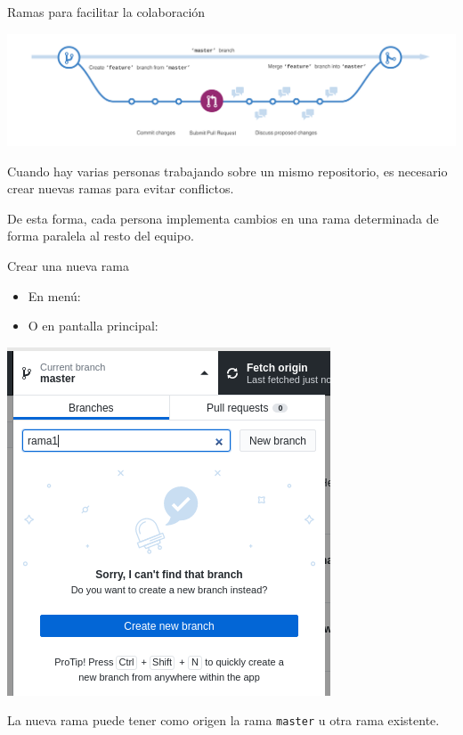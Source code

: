 \documentclass[xcolor={usenames,svgnames,dvipsnames}]{beamer}
\begin{document}
\begin{frame}[label={sec:orgbf606f8}]{Ramas para facilitar la colaboración}
\begin{center}
\includegraphics[width=.9\linewidth]{figs/branching.png}
\end{center}

Cuando hay varias personas trabajando sobre un mismo repositorio, es necesario crear nuevas ramas para evitar conflictos. 

De esta forma, cada persona implementa \alert{cambios} en una \alert{rama determinada} de forma paralela al resto del equipo.
\end{frame}

\begin{frame}[label={sec:orgea9fdf5},fragile]{Crear una nueva rama}
 \begin{itemize}
\item En menú: 

\item O en pantalla principal: 
\end{itemize}

\begin{center}
\includegraphics[height=0.5\textheight]{figs/nueva_rama_desktop.png}
\end{center}


La nueva rama puede tener como origen la rama \texttt{master} u otra rama existente.
\end{frame}
\end{document}
